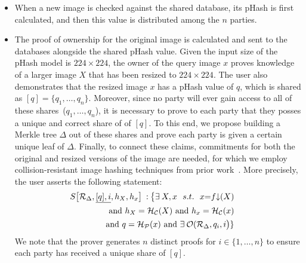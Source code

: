 {\begin{itemize}
    \item[]  When a new image is checked against the shared database, its pHash is first calculated, and then this value is distributed among the $n$ parties.\\
    
    \item[]  The proof of ownership for the original image is calculated and sent to the databases alongside the shared pHash value. Given the input size of the pHash model is $224 \times 224$, the owner of the query image $x$ proves knowledge of a larger image $X$ that has been resized to $224 \times 224$. The user also demonstrates that the resized image $x$ has a pHash value of $q$, which is shared as $[q]=\{q_1,\dots,q_n\}$. Moreover, since no party will ever gain access to all of these shares~($q_1,\dots,q_n$), it is necessary to prove to each party that they posses a unique and correct share of of $[q]$. To this end, we propose building a Merkle tree $\Delta$ out of these shares and prove each party is given a certain unique leaf of $\Delta$. Finally, to connect these claims, commitments for both the original and resized versions of the image are needed, for which we employ collision-resistant image hashing techniques from prior work~\cite{vimz, veritas}. More precisely, the user asserts the following statement:
    \begin{equation}\label{eq:state-image}
        \begin{split}
        \hspace{-0.5cm}S\bigr[\mathcal{R}_\Delta, \underline{[q], i}, h_X, h_x \bigr] \: :\: \bigr\{ \exists \: X,  x\:\:\: s.t. \:\:\: x{=}f{\downarrow}(X) \\
         \mbox{ and }  h_X=\mathcal{H}_\mathcal{C}(X) \mbox{ and } h_x= \mathcal{H}_\mathcal{C}(x) \\
        \mbox{ and } q=\mathcal{H}_\mathcal{P}(x) \mbox{  and  } \exists\:\mathcal{O}(\mathcal{R}_\Delta, q_i, i\bigr)\}
        \end{split}
    \end{equation}
    We note that the prover generates $n$ distinct proofs for $i \in \{1, \dots, n\}$ to ensure each party has received a unique share of $[q]$.\\
    

\end{itemize}}
